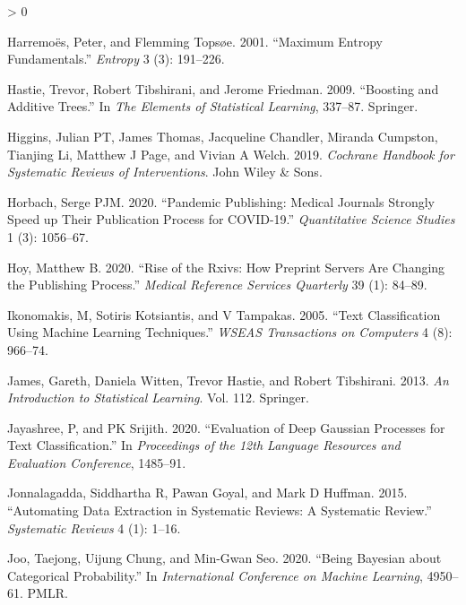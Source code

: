 \documentclass{article}
\newlength{\cslhangindent}
\newenvironment{CSLReferences}[2] %
 {%
  \setlength{\parindent}{0pt}
  \ifodd #1 \everypar{\setlength{\hangindent}{\cslhangindent}}\ignorespaces\fi
  \ifnum #2 > 0
  \setlength{\parskip}{#2\baselineskip}
  \fi
 }%
 {}
\begin{document}
\begin{CSLReferences}{1}{0}
\leavevmode\hypertarget{ref-harremoes2001maximum}{}%
Harremoës, Peter, and Flemming Topsøe. 2001. {``Maximum Entropy
Fundamentals.''} \emph{Entropy} 3 (3): 191--226.

\leavevmode\hypertarget{ref-hastie2009boosting}{}%
Hastie, Trevor, Robert Tibshirani, and Jerome Friedman. 2009.
{``Boosting and Additive Trees.''} In \emph{The Elements of Statistical
Learning}, 337--87. Springer.

\leavevmode\hypertarget{ref-higgins2019cochrane}{}%
Higgins, Julian PT, James Thomas, Jacqueline Chandler, Miranda Cumpston,
Tianjing Li, Matthew J Page, and Vivian A Welch. 2019. \emph{Cochrane
Handbook for Systematic Reviews of Interventions}. John Wiley \& Sons.

\leavevmode\hypertarget{ref-horbach2020pandemic}{}%
Horbach, Serge PJM. 2020. {``Pandemic Publishing: Medical Journals
Strongly Speed up Their Publication Process for COVID-19.''}
\emph{Quantitative Science Studies} 1 (3): 1056--67.

\leavevmode\hypertarget{ref-hoy2020rise}{}%
Hoy, Matthew B. 2020. {``Rise of the Rxivs: How Preprint Servers Are
Changing the Publishing Process.''} \emph{Medical Reference Services
Quarterly} 39 (1): 84--89.

\leavevmode\hypertarget{ref-ikonomakis2005text}{}%
Ikonomakis, M, Sotiris Kotsiantis, and V Tampakas. 2005. {``Text
Classification Using Machine Learning Techniques.''} \emph{WSEAS
Transactions on Computers} 4 (8): 966--74.

\leavevmode\hypertarget{ref-james2013introduction}{}%
James, Gareth, Daniela Witten, Trevor Hastie, and Robert Tibshirani.
2013. \emph{An Introduction to Statistical Learning}. Vol. 112.
Springer.

\leavevmode\hypertarget{ref-jayashree2020evaluation}{}%
Jayashree, P, and PK Srijith. 2020. {``Evaluation of Deep Gaussian
Processes for Text Classification.''} In \emph{Proceedings of the 12th
Language Resources and Evaluation Conference}, 1485--91.

\leavevmode\hypertarget{ref-jonnalagadda2015automating}{}%
Jonnalagadda, Siddhartha R, Pawan Goyal, and Mark D Huffman. 2015.
{``Automating Data Extraction in Systematic Reviews: A Systematic
Review.''} \emph{Systematic Reviews} 4 (1): 1--16.

\leavevmode\hypertarget{ref-joo2020being}{}%
Joo, Taejong, Uijung Chung, and Min-Gwan Seo. 2020. {``Being Bayesian
about Categorical Probability.''} In \emph{International Conference on
Machine Learning}, 4950--61. PMLR.


\end{CSLReferences}
\end{document}
